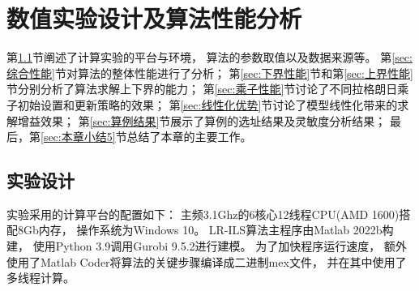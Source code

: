  \setlength{\baselineskip}{20pt}
 \setlength{\tabcolsep}{5pt}
\chapter{数值实验设计及算法性能分析}
\label{cha:算法性能章}

第\ref{sec:实验设计}节阐述了计算实验的平台与环境，
算法的参数取值以及数据来源等。
第\ref{sec:综合性能}节对算法的整体性能进行了分析；
第\ref{sec:下界性能}节和第\ref{sec:上界性能}节分别分析了算法求解上下界的能力；
第\ref{sec:乘子性能}节讨论了不同拉格朗日乘子初始设置和更新策略的效果；
第\ref{sec:线性化优势}节讨论了模型线性化带来的求解增益效果；
第\ref{sec:算例结果}节展示了算例的选址结果及灵敏度分析结果；
最后，第\ref{sec:本章小结5}节总结了本章的主要工作。

\section{实验设计}
\label{sec:实验设计}
实验采用的计算平台的配置如下：
主频3.1Ghz的6核心12线程CPU(AMD 1600)搭配8Gb内存，
操作系统为Windows 10。
LR-ILS算法主程序由Matlab 2022b构建，
使用Python 3.9调用Gurobi 9.5.2进行建模。
为了加快程序运行速度，
额外使用了Matlab Coder将算法的关键步骤编译成二进制mex文件，
并在其中使用了多线程计算。

